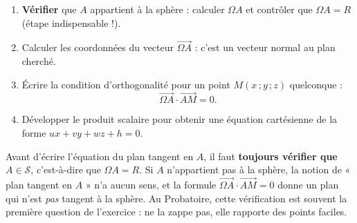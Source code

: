 \documentclass[11pt]{article}
\begin{document}
\begin{methode}
\begin{enumerate}
\item \textbf{Vérifier} que $A$ appartient à la sphère : calculer $\Omega A$ et contrôler que $\Omega A=R$ (étape indispensable !).
\item Calculer les coordonnées du vecteur $\overrightarrow{\Omega A}$ : c'est un vecteur normal au plan cherché.
\item Écrire la condition d'orthogonalité pour un point $M(x\,;y\,;z)$ quelconque :
\[
\overrightarrow{\Omega A}\cdot\overrightarrow{AM}=0.
\]
\item Développer le produit scalaire pour obtenir une équation cartésienne de la forme $ux+vy+wz+h=0$.
\end{enumerate}
\end{methode}

\begin{attention}
Avant d'écrire l'équation du plan tangent en $A$, il faut \textbf{toujours vérifier que $A\in\mathcal{S}$}, c'est-à-dire que $\Omega A=R$. Si $A$ n'appartient pas à la sphère, la notion de « plan tangent en $A$ » n'a aucun sens, et la formule $\overrightarrow{\Omega A}\cdot\overrightarrow{AM}=0$ donne un plan qui n'est \emph{pas} tangent à la sphère. Au Probatoire, cette vérification est souvent la première question de l'exercice : ne la zappe pas, elle rapporte des points faciles.
\end{attention}
\end{document}
